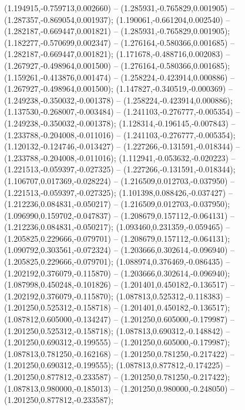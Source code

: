  (1.194915,-0.759713,0.002660) -- (1.285931,-0.765829,0.001905) -- (1.287357,-0.869054,0.001937);
 (1.190061,-0.661204,0.002540) -- (1.282187,-0.669447,0.001821) -- (1.285931,-0.765829,0.001905);
 (1.182277,-0.570699,0.002347) -- (1.276164,-0.580366,0.001685) -- (1.282187,-0.669447,0.001821);
 (1.171678,-0.488716,0.002083) -- (1.267927,-0.498964,0.001500) -- (1.276164,-0.580366,0.001685);
 (1.159261,-0.413876,0.001474) -- (1.258224,-0.423914,0.000886) -- (1.267927,-0.498964,0.001500);
 (1.147827,-0.340519,-0.000369) -- (1.249238,-0.350032,-0.001378) -- (1.258224,-0.423914,0.000886);
 (1.137530,-0.268007,-0.003484) -- (1.241103,-0.276777,-0.005354) -- (1.249238,-0.350032,-0.001378);
 (1.128314,-0.196145,-0.007843) -- (1.233788,-0.204008,-0.011016) -- (1.241103,-0.276777,-0.005354);
 (1.120132,-0.124746,-0.013427) -- (1.227266,-0.131591,-0.018344) -- (1.233788,-0.204008,-0.011016);
 (1.112941,-0.053632,-0.020223) -- (1.221513,-0.059397,-0.027325) -- (1.227266,-0.131591,-0.018344);
 (1.106707,0.017369,-0.028224) -- (1.216509,0.012703,-0.037950) -- (1.221513,-0.059397,-0.027325);
 (1.101398,0.088426,-0.037427) -- (1.212236,0.084831,-0.050217) -- (1.216509,0.012703,-0.037950);
 (1.096990,0.159702,-0.047837) -- (1.208679,0.157112,-0.064131) -- (1.212236,0.084831,-0.050217);
 (1.093460,0.231359,-0.059465) -- (1.205825,0.229666,-0.079701) -- (1.208679,0.157112,-0.064131);
 (1.090792,0.303561,-0.072324) -- (1.203666,0.302614,-0.096940) -- (1.205825,0.229666,-0.079701);
 (1.088974,0.376469,-0.086435) -- (1.202192,0.376079,-0.115870) -- (1.203666,0.302614,-0.096940);
 (1.087998,0.450248,-0.101826) -- (1.201401,0.450182,-0.136517) -- (1.202192,0.376079,-0.115870);
 (1.087813,0.525312,-0.118383) -- (1.201250,0.525312,-0.158718) -- (1.201401,0.450182,-0.136517);
 (1.087812,0.605000,-0.134247) -- (1.201250,0.605000,-0.179987) -- (1.201250,0.525312,-0.158718);
 (1.087813,0.690312,-0.148842) -- (1.201250,0.690312,-0.199555) -- (1.201250,0.605000,-0.179987);
 (1.087813,0.781250,-0.162168) -- (1.201250,0.781250,-0.217422) -- (1.201250,0.690312,-0.199555);
 (1.087813,0.877812,-0.174225) -- (1.201250,0.877812,-0.233587) -- (1.201250,0.781250,-0.217422);
 (1.087813,0.980000,-0.185013) -- (1.201250,0.980000,-0.248050) -- (1.201250,0.877812,-0.233587);
